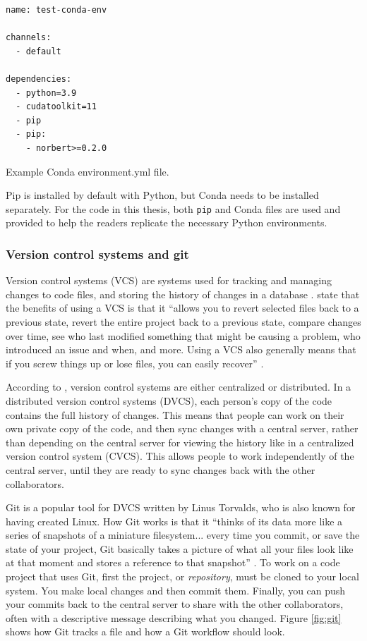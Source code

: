 \documentclass[report.tex]{subfiles}
\begin{document}
\begin{listing}[ht]
\centering
\begin{BVerbatim}
name: test-conda-env

channels:
  - default

dependencies:
  - python=3.9
  - cudatoolkit=11
  - pip
  - pip:
    - norbert>=0.2.0
\end{BVerbatim}
	\caption{Example Conda environment.yml file.}
	\label{lst:condayml}
\end{listing}

Pip is installed by default with Python, but Conda needs to be installed separately. For the code in this thesis, both \Verb#pip# and Conda files are used and provided to help the readers replicate the necessary Python environments.

\subsubsection{Version control systems and git}
\label{sec:gitvcs}

Version control systems (VCS) are systems used for tracking and managing changes to code files, and storing the history of changes in a database \parencite{gitbook}. \citeauthor{gitbook} state that the benefits of using a VCS is that it ``allows you to revert selected files back to a previous state, revert the entire project back to a previous state, compare changes over time, see who last modified something that might be causing a problem, who introduced an issue and when, and more. Using a VCS also generally means that if you screw things up or lose files, you can easily recover'' \parencite[1]{gitbook}.

According to \textcite{gitbook}, version control systems are either centralized or distributed. In a distributed version control systems (DVCS), each person's copy of the code contains the full history of changes. This means that people can work on their own private copy of the code, and then sync changes with a central server, rather than depending on the central server for viewing the history like in a centralized version control system (CVCS). This allows people to work independently of the central server, until they are ready to sync changes back with the other collaborators.

Git is a popular tool for DVCS written by Linus Torvalds, who is also known for having created Linux. How Git works is that it ``thinks of its data more like a series of snapshots of a miniature filesystem... every time you commit, or save the state of your project, Git basically takes a picture of what all your files look like at that moment and stores a reference to that snapshot'' \parencite[6]{gitbook}. To work on a code project that uses Git, first the project, or \textit{repository}, must be cloned to your local system. You make local changes and then commit them. Finally, you can push your commits back to the central server to share with the other collaborators, often with a descriptive message describing what you changed. Figure \ref{fig:git} shows how Git tracks a file and how a Git workflow should look.
\end{document}
